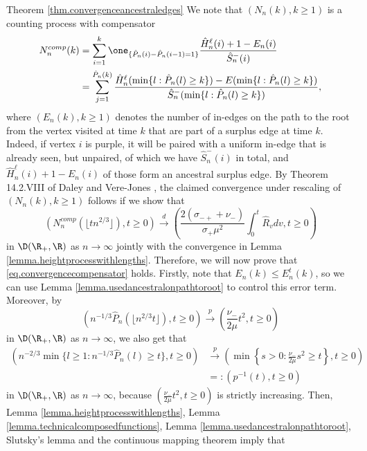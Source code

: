 \begin{proofof}{ Theorem \ref{thm.convergenceancestraledges}}
We note that $(N_n(k),k\geq 1)$ is a counting process with compensator 
\begin{align*}
    N_n^{comp}(k)&=\sum_{i=1}^k \one_{\{\hat{P}_n(i)-\hat{P}_n(i-1)=1\}}\frac{\hat{H}^\ell_n(i)+1-E_n(i)}{\hat{S}^-_n(i)}\\
    &=\sum_{j=1}^{\hat{P}_n(k)}\frac{\hat{H}^\ell_n(\min\{l:\hat{P}_n(l)\geq k\})-E(\min\{l:\hat{P}_n(l)\geq k\})}{\hat{S}^-_n(\min\{l:\hat{P}_n(l)\geq k\})},
\end{align*}
where $(E_n(k),k\geq 1)$ denotes the number of in-edges on the path to the root from the vertex visited at time $k$ that are part of a surplus edge at time $k$. Indeed, if vertex $i$ is purple, it will be paired with a uniform in-edge that is already seen, but unpaired, of which we have $\hat{S}^-_n(i)$ in total, and $\hat{H}^\ell_n(i)+1-E_n(i)$ of those form an ancestral surplus edge. By Theorem 14.2.VIII of Daley and Vere-Jones \cite{daleyIntroductionTheoryPoint2008}, the claimed convergence under rescaling of $(N_n(k),k\geq 1)$ follows if we show that 
\begin{equation}\label{eq.convergencecompensator}
    \left(N_n^{comp}\left(\lfloor tn^{2/3}\rfloor \right), t\geq 0\right)\overset{d}{\to}\left(\frac{2(\sigma_{-+}+\nu_-)}{\sigma_+\mu^2} \int_0^t\hat{R}_v dv, t \geq 0\right)
\end{equation}
in $\D(\R_+,\R)$ as $n\to \infty$ jointly with the convergence in Lemma \ref{lemma.heightprocesswithlengths}. Therefore, we will now prove that \eqref{eq.convergencecompensator} holds. 
Firstly, note that $E_n(k)\leq E_n^t(k)$, so we can use Lemma \ref{lemma.usedancestralonpathtoroot} to control this error term. Moreover, by
$$\left(n^{-1/3}\hat{P}_n\left(\lfloor n^{2/3}t\rfloor \right),t\geq 0\right)\overset{p}{\to}\left(\frac{\nu_-}{2\mu}t^2,t\geq 0\right)$$
in $\D(\R_+,\R)$ as $n\to \infty$,
we also get that
\begin{align*}\left(n^{-2/3}\min\{l\geq 1:n^{-1/3}\hat{P}_n(l)\geq t\},t\geq 0\right)&\overset{p}{\to}\left(\min\left\{s>0: \frac{\nu_-}{2\mu}s^2\geq t\right \}, t\geq 0\right)\\
&=:\left(p^{-1}(t),t\geq 0\right) \end{align*}
in $\D(\R_+,\R)$ as $n\to \infty$, because $\left(\frac{\nu_-}{2\mu}t^2,t\geq 0\right)$ is strictly increasing. Then, Lemma \ref{lemma.heightprocesswithlengths}, Lemma \ref{lemma.technicalcomposedfunctions}, Lemma \ref{lemma.usedancestralonpathtoroot}, Slutsky's lemma and the continuous mapping theorem imply that 

\end{proofof}
